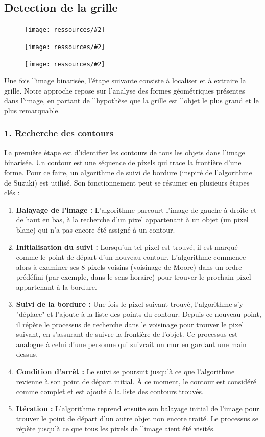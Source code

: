 \documentclass{article}
\newcommand{\stepimage}[3][0.3\textwidth]{%
  \minipage{#1}
    \texttt{[image: ressources/\#2]}
    \caption{#3}
  \endminipage\hfill
}
\begin{document}
\subsection{Detection de la grille}
\begin{figure}[!htb]
    \stepimage[0.30\textwidth]{1step_05_grid_extraction.png}{}
    \stepimage[0.33\textwidth]{2step_05_grid_extraction.png}{}
    \stepimage[0.26\textwidth]{3step_05_grid_extraction.png}{}
\end{figure}

Une fois l'image binarisée, l'étape suivante consiste à localiser et à extraire la grille. Notre approche repose sur l'analyse des formes géométriques présentes dans l'image, en partant de l'hypothèse que la grille est l'objet le plus grand et le plus remarquable.

\subsubsection{1. Recherche des contours}
La première étape est d'identifier les contours de tous les objets dans l'image binarisée. Un contour est une séquence de pixels qui trace la frontière d'une forme. Pour ce faire, un algorithme de suivi de bordure (inspiré de l'algorithme de Suzuki) est utilisé. Son fonctionnement peut se résumer en plusieurs étapes clés :

\begin{enumerate}
    \item \textbf{Balayage de l'image :} L'algorithme parcourt l'image de gauche à droite et de haut en bas, à la recherche d'un pixel appartenant à un objet (un pixel blanc) qui n'a pas encore été assigné à un contour.

    \item \textbf{Initialisation du suivi :} Lorsqu'un tel pixel est trouvé, il est marqué comme le point de départ d'un nouveau contour. L'algorithme commence alors à examiner ses 8 pixels voisins (voisinage de Moore) dans un ordre prédéfini (par exemple, dans le sens horaire) pour trouver le prochain pixel appartenant à la bordure.

    \item \textbf{Suivi de la bordure :} Une fois le pixel suivant trouvé, l'algorithme s'y "déplace" et l'ajoute à la liste des points du contour. Depuis ce nouveau point, il répète le processus de recherche dans le voisinage pour trouver le pixel suivant, en s'assurant de suivre la frontière de l'objet. Ce processus est analogue à celui d'une personne qui suivrait un mur en gardant une main dessus.

    \item \textbf{Condition d'arrêt :} Le suivi se poursuit jusqu'à ce que l'algorithme revienne à son point de départ initial. À ce moment, le contour est considéré comme complet et est ajouté à la liste des contours trouvés.

    \item \textbf{Itération :} L'algorithme reprend ensuite son balayage initial de l'image pour trouver le point de départ d'un autre objet non encore traité. Le processus se répète jusqu'à ce que tous les pixels de l'image aient été visités.
\end{enumerate}
\end{document}
